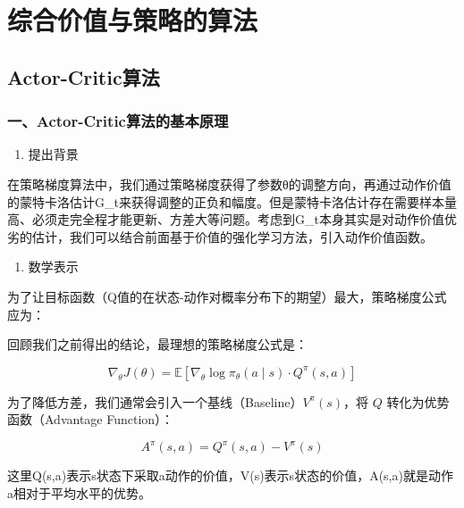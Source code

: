 \hypertarget{ux7efcux5408ux4ef7ux503cux4e0eux7b56ux7565ux7684ux7b97ux6cd5}{%
\chapter{综合价值与策略的算法}\label{ux7efcux5408ux4ef7ux503cux4e0eux7b56ux7565ux7684ux7b97ux6cd5}}

\hypertarget{actor-criticux7b97ux6cd5}{%
\section{Actor-Critic算法}\label{actor-criticux7b97ux6cd5}}

\hypertarget{ux4e00actor-criticux7b97ux6cd5ux7684ux57faux672cux539fux7406}{%
\subsection{一、Actor-Critic算法的基本原理}\label{ux4e00actor-criticux7b97ux6cd5ux7684ux57faux672cux539fux7406}}

\begin{enumerate}
\def\labelenumi{\arabic{enumi}.}
\tightlist
\item
  提出背景
\end{enumerate}

在策略梯度算法中，我们通过策略梯度获得了参数θ的调整方向，再通过动作价值的蒙特卡洛估计G\_t来获得调整的正负和幅度。但是蒙特卡洛估计存在需要样本量高、必须走完全程才能更新、方差大等问题。考虑到G\_t本身其实是对动作价值优劣的估计，我们可以结合前面基于价值的强化学习方法，引入动作价值函数。

\begin{enumerate}
\def\labelenumi{\arabic{enumi}.}
\setcounter{enumi}{1}
\tightlist
\item
  数学表示
\end{enumerate}

为了让目标函数（Q值的在状态-动作对概率分布下的期望）最大，策略梯度公式应为：

回顾我们之前得出的结论，最理想的策略梯度公式是：

\[
\nabla_\theta J(\theta)=\mathbb{E}\left[\nabla_\theta\log\pi_\theta(a\mid s)\cdot Q^\pi(s,a)\right]
\]

为了降低方差，我们通常会引入一个基线（Baseline）\(V^\pi(s)\)，将 \(Q\) 转化为优势函数（Advantage Function）：

\[
A^\pi(s,a)=Q^\pi(s,a)-V^\pi(s)
\]

这里Q(s,a)表示s状态下采取a动作的价值，V(s)表示s状态的价值，A(s,a)就是动作a相对于平均水平的优势。

